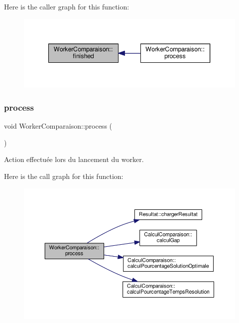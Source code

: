 Here is the caller graph for this function\+:\nopagebreak
\begin{figure}[H]
\begin{center}
\leavevmode
\includegraphics[width=340pt]{classWorkerComparaison_a22ed9afba5f29d89a014b2b895d995b2_icgraph}
\end{center}
\end{figure}
\mbox{\label{classWorkerComparaison_ac62afd6b36f0c1590e5f3878334a9928}} 
\subsubsection{\texorpdfstring{process}{process}}
{\footnotesize\ttfamily void Worker\+Comparaison\+::process (\begin{DoxyParamCaption}{ }\end{DoxyParamCaption})\hspace{0.3cm}{\ttfamily [slot]}}



Action effectuée lors du lancement du worker. 

Here is the call graph for this function\+:\nopagebreak
\begin{figure}[H]
\begin{center}
\leavevmode
\includegraphics[width=350pt]{classWorkerComparaison_ac62afd6b36f0c1590e5f3878334a9928_cgraph}
\end{center}
\end{figure}
\mbox{\label{classWorkerComparaison_afc5278dea0a1d826ece10555812266bd}} 

